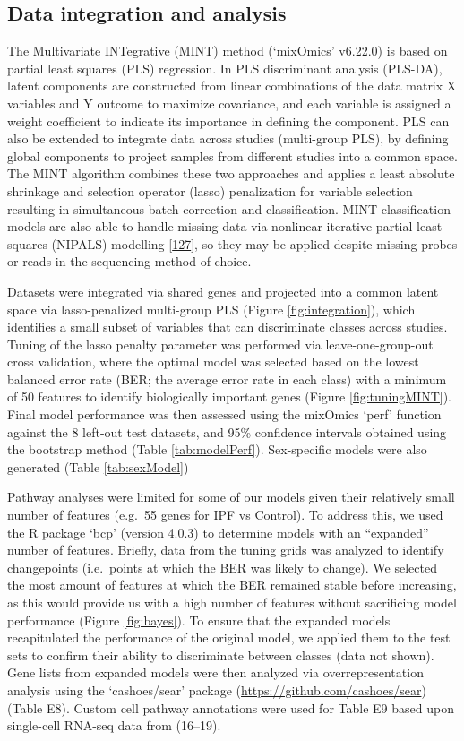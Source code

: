 \documentclass[
]{article}
\begin{document}
\hypertarget{data}{%
\subsection{Data integration and analysis}\label{data}}

The Multivariate INTegrative (MINT) method (`mixOmics' v6.22.0) is based on partial least squares (PLS) regression. In PLS discriminant analysis (PLS-DA), latent components are constructed from linear combinations of the data matrix X variables and Y outcome to maximize covariance, and each variable is assigned a weight coefficient to indicate its importance in defining the component. PLS can also be extended to integrate data across studies (multi-group PLS), by defining global components to project samples from different studies into a common space. The MINT algorithm combines these two approaches and applies a least absolute shrinkage and selection operator (lasso) penalization for variable selection resulting in simultaneous batch correction and classification. MINT classification models are also able to handle missing data via nonlinear iterative partial least squares (NIPALS) modelling {[}\protect\hyperlink{ref-wold_nonlinear_1973}{127}{]}, so they may be applied despite missing probes or reads in the sequencing method of choice.

Datasets were integrated via shared genes and projected into a common latent space via lasso-penalized multi-group PLS (Figure \ref{fig:integration}), which identifies a small subset of variables that can discriminate classes across studies. Tuning of the lasso penalty parameter was performed via leave-one-group-out cross validation, where the optimal model was selected based on the lowest balanced error rate (BER; the average error rate in each class) with a minimum of 50 features to identify biologically important genes (Figure \ref{fig:tuningMINT}). Final model performance was then assessed using the mixOmics `perf' function against the 8 left-out test datasets, and 95\% confidence intervals obtained using the bootstrap method (Table \ref{tab:modelPerf}). Sex-specific models were also generated (Table \ref{tab:sexModel})

Pathway analyses were limited for some of our models given their relatively small number of features (e.g.~55 genes for IPF vs Control). To address this, we used the R package `bcp' (version 4.0.3) to determine models with an ``expanded'' number of features. Briefly, data from the tuning grids was analyzed to identify changepoints (i.e.~points at which the BER was likely to change). We selected the most amount of features at which the BER remained stable before increasing, as this would provide us with a high number of features without sacrificing model performance (Figure \ref{fig:bayes}). To ensure that the expanded models recapitulated the performance of the original model, we applied them to the test sets to confirm their ability to discriminate between classes (data not shown).
Gene lists from expanded models were then analyzed via overrepresentation analysis using the `cashoes/sear' package (\url{https://github.com/cashoes/sear}) (Table E8).
Custom cell pathway annotations were used for Table E9 based upon single-cell RNA-seq data from (16--19).
\end{document}
